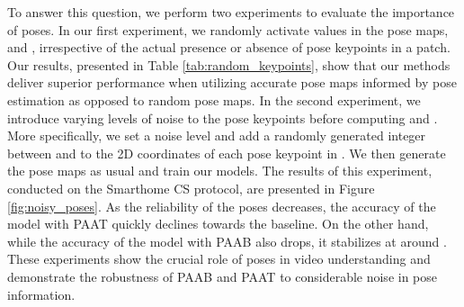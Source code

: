 \documentclass{article}
\begin{document}
To answer this question, we perform two experiments to evaluate the importance of poses. In our first experiment, we randomly activate values in the pose maps,  and , irrespective of the actual presence or absence of pose keypoints in a patch. Our results, presented in Table \ref{tab:random_keypoints}, show that our methods deliver superior performance when utilizing accurate pose maps informed by pose estimation as opposed to random pose maps.
In the second experiment, we introduce varying levels of noise to the pose keypoints before computing  and . More specifically, we set a noise level  and add a randomly generated integer between  and  to the 2D coordinates of each pose keypoint in . We then generate the pose maps as usual and train our models. The results of this experiment, conducted on the Smarthome CS protocol, are presented in Figure \ref{fig:noisy_poses}. As the reliability of the poses decreases, the accuracy of the model with PAAT quickly declines towards the baseline. On the other hand, while the accuracy of the model with PAAB also drops, it stabilizes at around . These experiments show the crucial role of  poses in video understanding and demonstrate the robustness of PAAB and PAAT to considerable noise in pose information.
\end{document}
